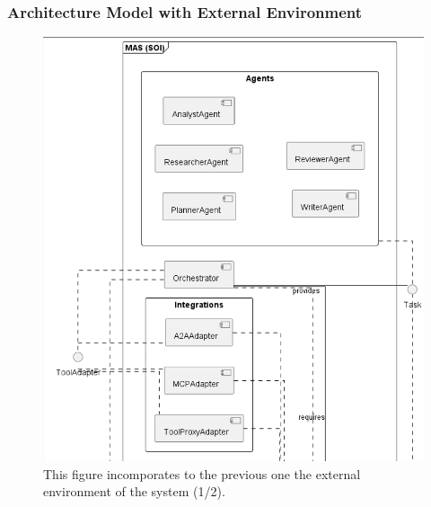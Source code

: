 \subsubsection*{Architecture Model with External Environment}
\begin{figure}[htbp]
  \centering
  \includegraphics[width=0.9\linewidth]{ressources/MAS/diagrams/MAS_arch_and_environment1.png}
  \caption{This figure incomporates to the previous one the external environment of the system (1/2).}
  \label{fig:app-mas-arch-mod}
\end{figure}

\clearpage
